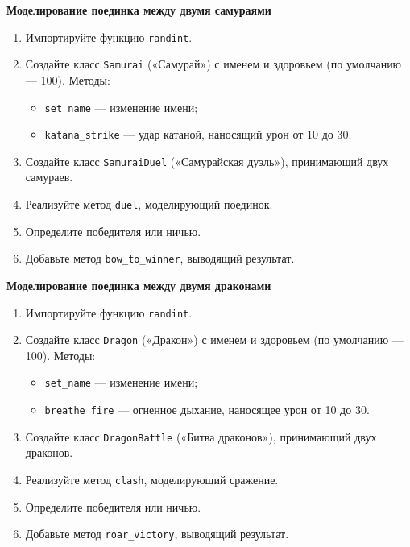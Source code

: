 \item \textbf{Моделирование поединка между двумя самураями}

\begin{enumerate}
    \item Импортируйте функцию \texttt{randint}.

    \item Создайте класс \texttt{Samurai} («Самурай») с именем и здоровьем (по умолчанию — 100).  
    Методы:
    \begin{itemize}
        \item \texttt{set\_name} — изменение имени;
        \item \texttt{katana\_strike} — удар катаной, наносящий урон от 10 до 30.
    \end{itemize}

    \item Создайте класс \texttt{SamuraiDuel} («Самурайская дуэль»), принимающий двух самураев.

    \item Реализуйте метод \texttt{duel}, моделирующий поединок.

    \item Определите победителя или ничью.

    \item Добавьте метод \texttt{bow\_to\_winner}, выводящий результат.
\end{enumerate}

\item \textbf{Моделирование поединка между двумя драконами}

\begin{enumerate}
    \item Импортируйте функцию \texttt{randint}.

    \item Создайте класс \texttt{Dragon} («Дракон») с именем и здоровьем (по умолчанию — 100).  
    Методы:
    \begin{itemize}
        \item \texttt{set\_name} — изменение имени;
        \item \texttt{breathe\_fire} — огненное дыхание, наносящее урон от 10 до 30.
    \end{itemize}

    \item Создайте класс \texttt{DragonBattle} («Битва драконов»), принимающий двух драконов.

    \item Реализуйте метод \texttt{clash}, моделирующий сражение.

    \item Определите победителя или ничью.

    \item Добавьте метод \texttt{roar\_victory}, выводящий результат.
\end{enumerate}

